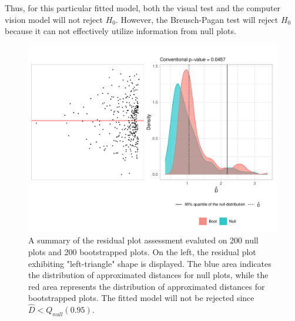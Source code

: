 \documentclass[]{interact}
\theoremstyle{plain}%
\theoremstyle{definition}
\theoremstyle{remark}
\begin{document}
Thus, for this particular fitted model, both the visual test and the
computer vision model will not reject \(H_0\). However, the
Breusch-Pagan test will reject \(H_0\) because it can not effectively
utilize information from null plots.

\begin{figure}[!h]

{\centering \includegraphics[width=1\linewidth]{paper_files/figure-latex/false-check-1} 

}

\caption{A summary of the residual plot assessment evaluted on 200 null plots and 200 bootstrapped plots. On the left, the residual plot exhibiting "left-triangle" shape is displayed. The blue area indicates the distribution of approximated distances for null plots, while the red area represents the distribution of approximated distances for bootstrapped plots. The fitted model will not be rejected since $\hat{D} < Q_{null}(0.95)$.}\label{fig:false-check}
\end{figure}
\end{document}
